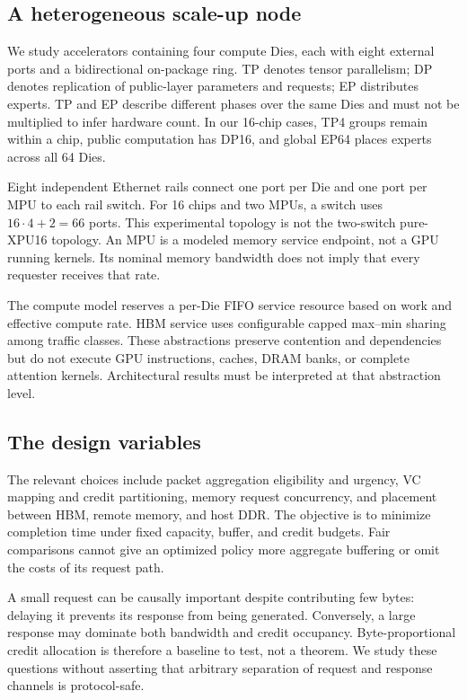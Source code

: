 \documentclass[conference]{IEEEtran}
\begin{document}
\subsection{A heterogeneous scale-up node}
We study accelerators containing four compute Dies, each with eight external ports and a bidirectional on-package ring. TP denotes tensor parallelism; DP denotes replication of public-layer parameters and requests; EP distributes experts. TP and EP describe different phases over the same Dies and must not be multiplied to infer hardware count. In our 16-chip cases, TP4 groups remain within a chip, public computation has DP16, and global EP64 places experts across all 64 Dies.

Eight independent Ethernet rails connect one port per Die and one port per MPU to each rail switch. For 16 chips and two MPUs, a switch uses $16\cdot4+2=66$ ports. This experimental topology is not the two-switch pure-XPU16 topology. An MPU is a modeled memory service endpoint, not a GPU running kernels. Its nominal memory bandwidth does not imply that every requester receives that rate.

The compute model reserves a per-Die FIFO service resource based on work and effective compute rate. HBM service uses configurable capped max--min sharing among traffic classes. These abstractions preserve contention and dependencies but do not execute GPU instructions, caches, DRAM banks, or complete attention kernels. Architectural results must be interpreted at that abstraction level.

\subsection{The design variables}
The relevant choices include packet aggregation eligibility and urgency, VC mapping and credit partitioning, memory request concurrency, and placement between HBM, remote memory, and host DDR. The objective is to minimize completion time under fixed capacity, buffer, and credit budgets. Fair comparisons cannot give an optimized policy more aggregate buffering or omit the costs of its request path.

A small request can be causally important despite contributing few bytes: delaying it prevents its response from being generated. Conversely, a large response may dominate both bandwidth and credit occupancy. Byte-proportional credit allocation is therefore a baseline to test, not a theorem. We study these questions without asserting that arbitrary separation of request and response channels is protocol-safe.
\end{document}
